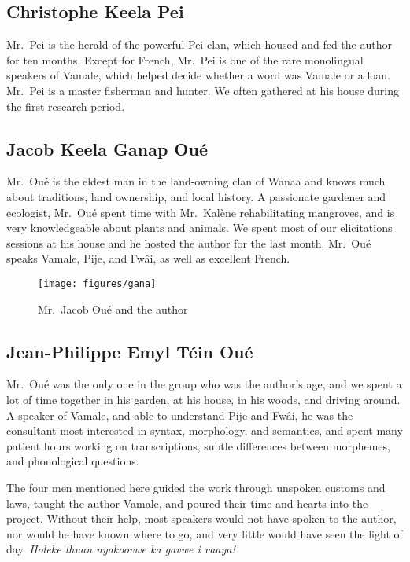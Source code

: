 \subsection{Christophe Keela Pei}

Mr.\ Pei is the herald of the powerful Pei clan, which housed and fed the author for ten months. Except for French, Mr.\ Pei is one of the rare monolingual speakers of Vamale, which helped decide whether a word was Vamale or a loan. Mr.\ Pei is a master fisherman and hunter. We often gathered at his house during the first research period.

\subsection{Jacob Keela Ganap Oué}

Mr.\ Oué is the eldest man in the land-owning clan of Wanaa and knows much about traditions, land ownership, and local history. A passionate gardener and ecologist, Mr.\ Oué spent time with Mr.\ Kalène rehabilitating mangroves, and is very knowledgeable about plants and animals. We spent most of our elicitations sessions at his house and he hosted the author for the last month. Mr.\ Oué speaks Vamale, Pije, and Fwâi, as well as excellent French. 

\begin{figure}
	\texttt{[image: figures/gana]}
	\caption{Mr.\ Jacob Oué and the author}
\end{figure}

\subsection{Jean-Philippe Emyl Téin Oué}

Mr.\ Oué was the only one in the group who was the author's age, and we spent a lot of time together in his garden, at his house, in his woods, and driving around. A speaker of Vamale, and able to understand Pije and Fwâi, he was the consultant most interested in syntax, morphology, and semantics, and spent many patient hours working on transcriptions, subtle differences between morphemes, and phonological questions.

The four men mentioned here guided the work through unspoken customs and laws, taught the author Vamale, and poured their time and hearts into the project. Without their help, most speakers would not have spoken to the author, nor would he have known where to go, and very little would have seen the light of day. \textit{Holeke thuan nyakoovwe ka gavwe i vaaya!}



